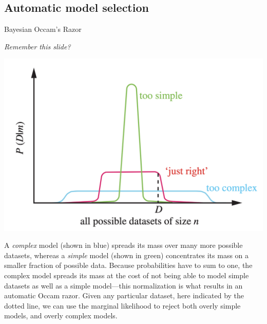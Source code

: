 \documentclass[10pt]{beamer}
\begin{document}
\subsection{Automatic model selection}

\begin{frame}{Bayesian Occam's Razor}
\scriptsize

\textit{Remember this slide?}

\begin{center}
\includegraphics[width=.6\textwidth]{images/auto_occams_razor}
\end{center}
A \textit{complex} model (shown in blue) spreads its mass over many
more possible datasets, whereas a \textit{simple} model (shown in green) concentrates its mass on a smaller fraction of possible data.
Because probabilities have to sum to one, the complex model spreads its mass at the cost of not being able to model simple
datasets as well as a simple model—this normalization is what results in an automatic Occam razor. Given any particular
dataset, here indicated by the dotted line, we can use the marginal likelihood to reject both overly simple models, and overly
complex models. 


\end{frame}
\end{document}
